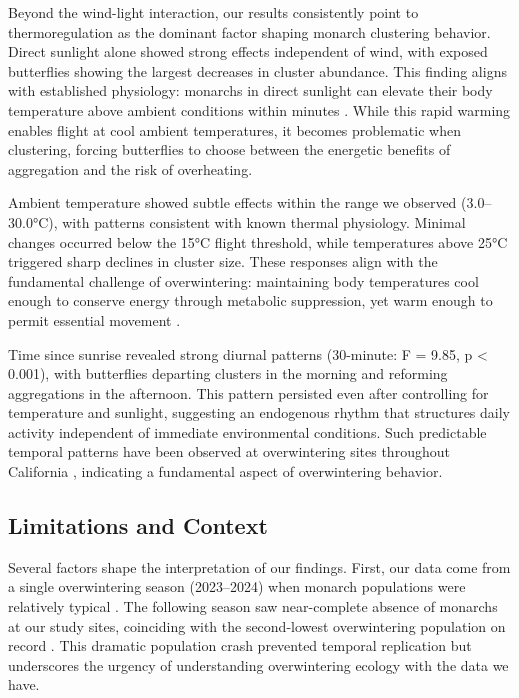 Beyond the wind-light interaction, our results consistently point to thermoregulation as the dominant factor shaping monarch clustering behavior. Direct sunlight alone showed strong effects independent of wind, with exposed butterflies showing the largest decreases in cluster abundance. This finding aligns with established physiology: monarchs in direct sunlight can elevate their body temperature above ambient conditions within minutes \parencite{mastersMonarchButterflyDanaus1988}. While this rapid warming enables flight at cool ambient temperatures, it becomes problematic when clustering, forcing butterflies to choose between the energetic benefits of aggregation and the risk of overheating.

Ambient temperature showed subtle effects within the range we observed (3.0--30.0°C), with patterns consistent with known thermal physiology. Minimal changes occurred below the 15°C flight threshold, while temperatures above 25°C triggered sharp declines in cluster size. These responses align with the fundamental challenge of overwintering: maintaining body temperatures cool enough to conserve energy through metabolic suppression, yet warm enough to permit essential movement \parencite{mastersMonarchButterflyDanaus1988}.

Time since sunrise revealed strong diurnal patterns (30-minute: F = 9.85, p < 0.001), with butterflies departing clusters in the morning and reforming aggregations in the afternoon. This pattern persisted even after controlling for temperature and sunlight, suggesting an endogenous rhythm that structures daily activity independent of immediate environmental conditions. Such predictable temporal patterns have been observed at overwintering sites throughout California \parencite{tuskesOverwinteringEcologyMonarch1978,chaplinEnergyReservesMetabolic1982}, indicating a fundamental aspect of overwintering behavior.

\subsection{Limitations and Context}

Several factors shape the interpretation of our findings. First, our data come from a single overwintering season (2023--2024) when monarch populations were relatively typical \parencite{xercessocietyWesternMonarchThanksgiving2025}. The following season saw near-complete absence of monarchs at our study sites, coinciding with the second-lowest overwintering population on record \parencite{xercessocietyWesternMonarchButterfly2025}. This dramatic population crash prevented temporal replication but underscores the urgency of understanding overwintering ecology with the data we have.


